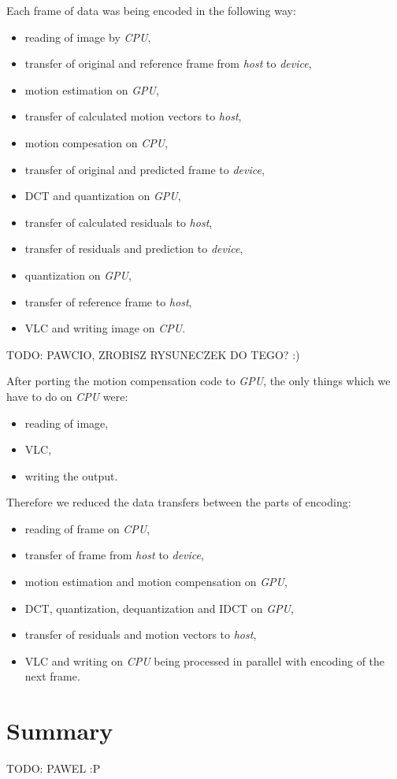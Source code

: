 \documentclass[11pt]{article}
\begin{document}
Each frame of data was being encoded in the following way:
\begin{itemize}
  \item reading of image by \emph{CPU},
  \item transfer of original and reference frame from \emph{host} to 
  \emph{device},
  \item motion estimation on \emph{GPU},
  \item transfer of calculated motion vectors to \emph{host},
  \item motion compesation on \emph{CPU},
  \item transfer of original and predicted frame to \emph{device},
  \item DCT and quantization on \emph{GPU},
  \item transfer of calculated residuals to \emph{host},
  \item transfer of residuals and prediction to \emph{device},
  \item quantization on \emph{GPU},
  \item transfer of reference frame to \emph{host},
  \item VLC and writing image on \emph{CPU}.
\end{itemize}
TODO: PAWCIO, ZROBISZ RYSUNECZEK DO TEGO? :)

After porting the motion compensation code to \emph{GPU}, the only things
which we have to do on \emph{CPU} were:
\begin{itemize}
  \item reading of image,
  \item VLC,
  \item writing the output.
\end{itemize}
Therefore we reduced the data transfers between the parts of encoding:
\begin{itemize}
  \item reading of frame on \emph{CPU},
  \item transfer of frame from \emph{host} to \emph{device},
  \item motion estimation and motion compensation on \emph{GPU},
  \item DCT, quantization, dequantization and IDCT on \emph{GPU},
  \item transfer of residuals and motion vectors to \emph{host},
  \item VLC and writing on \emph{CPU} being processed in parallel with
  encoding of the next frame.
\end{itemize}

\section{Summary}
TODO: PAWEL :P
\end{document}

